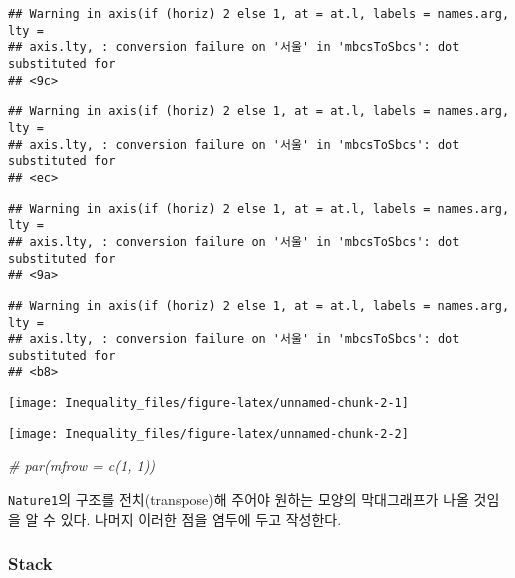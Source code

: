 \documentclass[
]{article}
\newenvironment{Shaded}{\begin{snugshade}}{\end{snugshade}}
\newcommand{\CommentTok}[1]{\textcolor[rgb]{0.56,0.35,0.01}{\textit{#1}}}
\newcommand{\NormalTok}[1]{#1}
\newcommand{\OperatorTok}[1]{\textcolor[rgb]{0.81,0.36,0.00}{\textbf{#1}}}
\newcommand{\StringTok}[1]{\textcolor[rgb]{0.31,0.60,0.02}{#1}}
\begin{document}
\begin{verbatim}
## Warning in axis(if (horiz) 2 else 1, at = at.l, labels = names.arg, lty =
## axis.lty, : conversion failure on '서울' in 'mbcsToSbcs': dot substituted for
## <9c>
\end{verbatim}

\begin{verbatim}
## Warning in axis(if (horiz) 2 else 1, at = at.l, labels = names.arg, lty =
## axis.lty, : conversion failure on '서울' in 'mbcsToSbcs': dot substituted for
## <ec>
\end{verbatim}

\begin{verbatim}
## Warning in axis(if (horiz) 2 else 1, at = at.l, labels = names.arg, lty =
## axis.lty, : conversion failure on '서울' in 'mbcsToSbcs': dot substituted for
## <9a>
\end{verbatim}

\begin{verbatim}
## Warning in axis(if (horiz) 2 else 1, at = at.l, labels = names.arg, lty =
## axis.lty, : conversion failure on '서울' in 'mbcsToSbcs': dot substituted for
## <b8>
\end{verbatim}

\texttt{[image: Inequality\_files/figure-latex/unnamed-chunk-2-1]}

\begin{Shaded}
\end{Shaded}

\texttt{[image: Inequality\_files/figure-latex/unnamed-chunk-2-2]}

\begin{Shaded}
\begin{Highlighting}[]
\CommentTok{# par(mfrow = c(1, 1))}
\end{Highlighting}
\end{Shaded}

\texttt{Nature1}의 구조를 전치(transpose)해 주어야 원하는 모양의
막대그래프가 나올 것임을 알 수 있다. 나머지 이러한 점을 염두에 두고
작성한다.

\hypertarget{stack}{%
\subsubsection{Stack}\label{stack}}
\end{document}
